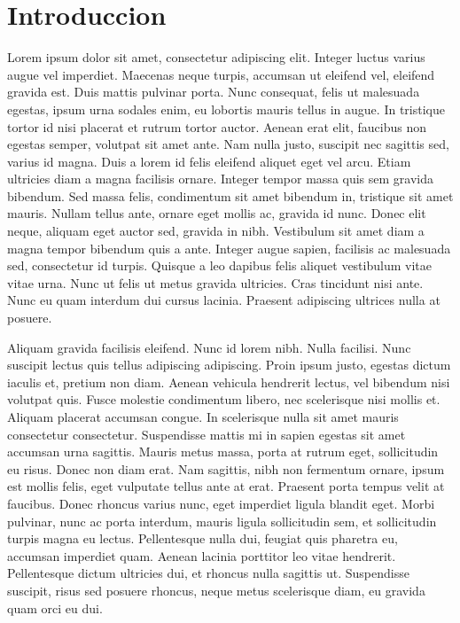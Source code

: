 %
%

\chapter[Introduccion]{
	Introduccion
}

Lorem ipsum dolor sit amet, consectetur adipiscing elit. Integer luctus varius augue vel imperdiet. Maecenas neque turpis, accumsan ut eleifend vel, eleifend gravida est. Duis mattis pulvinar porta. Nunc consequat, felis ut malesuada egestas, ipsum urna sodales enim, eu lobortis mauris tellus in augue. In tristique tortor id nisi placerat et rutrum tortor auctor. Aenean erat elit, faucibus non egestas semper, volutpat sit amet ante. Nam nulla justo, suscipit nec sagittis sed, varius id magna. Duis a lorem id felis eleifend aliquet eget vel arcu. Etiam ultricies diam a magna facilisis ornare. Integer tempor massa quis sem gravida bibendum. Sed massa felis, condimentum sit amet bibendum in, tristique sit amet mauris. Nullam tellus ante, ornare eget mollis ac, gravida id nunc. Donec elit neque, aliquam eget auctor sed, gravida in nibh. Vestibulum sit amet diam a magna tempor bibendum quis a ante. Integer augue sapien, facilisis ac malesuada sed, consectetur id turpis. Quisque a leo dapibus felis aliquet vestibulum vitae vitae urna. Nunc ut felis ut metus gravida ultricies. Cras tincidunt nisi ante. Nunc eu quam interdum dui cursus lacinia. Praesent adipiscing ultrices nulla at posuere.

Aliquam gravida facilisis eleifend. Nunc id lorem nibh. Nulla facilisi. Nunc suscipit lectus quis tellus adipiscing adipiscing. Proin ipsum justo, egestas dictum iaculis et, pretium non diam. Aenean vehicula hendrerit lectus, vel bibendum nisi volutpat quis. Fusce molestie condimentum libero, nec scelerisque nisi mollis et. Aliquam placerat accumsan congue. In scelerisque nulla sit amet mauris consectetur consectetur. Suspendisse mattis mi in sapien egestas sit amet accumsan urna sagittis. Mauris metus massa, porta at rutrum eget, sollicitudin eu risus. Donec non diam erat. Nam sagittis, nibh non fermentum ornare, ipsum est mollis felis, eget vulputate tellus ante at erat. Praesent porta tempus velit at faucibus. Donec rhoncus varius nunc, eget imperdiet ligula blandit eget. Morbi pulvinar, nunc ac porta interdum, mauris ligula sollicitudin sem, et sollicitudin turpis magna eu lectus. Pellentesque nulla dui, feugiat quis pharetra eu, accumsan imperdiet quam. Aenean lacinia porttitor leo vitae hendrerit. Pellentesque dictum ultricies dui, et rhoncus nulla sagittis ut. Suspendisse suscipit, risus sed posuere rhoncus, neque metus scelerisque diam, eu gravida quam orci eu dui.

